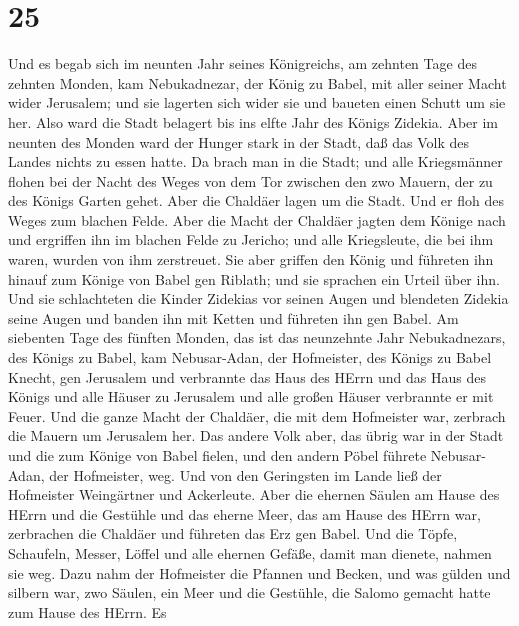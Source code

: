 \hypertarget{section-24}{%
\section{25}\label{section-24}}

 Und es begab sich im neunten Jahr seines Königreichs, am
zehnten Tage des zehnten Monden, kam Nebukadnezar, der König zu Babel,
mit aller seiner Macht wider Jerusalem; und sie lagerten sich wider sie
und baueten einen Schutt um sie her.  Also ward die Stadt
belagert bis ins elfte Jahr des Königs Zidekia.  Aber im
neunten des Monden ward der Hunger stark in der Stadt, daß das Volk des
Landes nichts zu essen hatte.  Da brach man in die Stadt;
und alle Kriegsmänner flohen bei der Nacht des Weges von dem Tor
zwischen den zwo Mauern, der zu des Königs Garten gehet. Aber die
Chaldäer lagen um die Stadt. Und er floh des Weges zum blachen Felde.
 Aber die Macht der Chaldäer jagten dem Könige nach und
ergriffen ihn im blachen Felde zu Jericho; und alle Kriegsleute, die bei
ihm waren, wurden von ihm zerstreuet.  Sie aber griffen den
König und führeten ihn hinauf zum Könige von Babel gen Riblath; und sie
sprachen ein Urteil über ihn.  Und sie schlachteten die
Kinder Zidekias vor seinen Augen und blendeten Zidekia seine Augen und
banden ihn mit Ketten und führeten ihn gen Babel.  Am
siebenten Tage des fünften Monden, das ist das neunzehnte Jahr
Nebukadnezars, des Königs zu Babel, kam Nebusar-Adan, der Hofmeister,
des Königs zu Babel Knecht, gen Jerusalem  und verbrannte
das Haus des HErrn und das Haus des Königs und alle Häuser zu Jerusalem
und alle großen Häuser verbrannte er mit Feuer.  Und die
ganze Macht der Chaldäer, die mit dem Hofmeister war, zerbrach die
Mauern um Jerusalem her.  Das andere Volk aber, das übrig
war in der Stadt und die zum Könige von Babel fielen, und den andern
Pöbel führete Nebusar-Adan, der Hofmeister, weg.  Und von
den Geringsten im Lande ließ der Hofmeister Weingärtner und Ackerleute.
 Aber die ehernen Säulen am Hause des HErrn und die
Gestühle und das eherne Meer, das am Hause des HErrn war, zerbrachen die
Chaldäer und führeten das Erz gen Babel.  Und die Töpfe,
Schaufeln, Messer, Löffel und alle ehernen Gefäße, damit man dienete,
nahmen sie weg.  Dazu nahm der Hofmeister die Pfannen und
Becken, und was gülden und silbern war,  zwo Säulen, ein
Meer und die Gestühle, die Salomo gemacht hatte zum Hause des HErrn. Es
